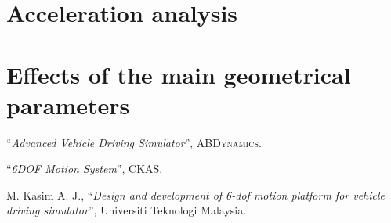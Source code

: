 \documentclass[10.5pt, twocolumn]{article}
\newcommand{\Virgolette}[1]{``#1''}
\begin{document}
\section{Acceleration analysis}

\section{Effects of the main geometrical parameters}


\begin{thebibliography}{}
\Virgolette{\textit{Advanced Vehicle Driving Simulator}}, \textsc{ABDynamics}.

\Virgolette{\textit{6DOF Motion System}}, \textsc{CKAS}.

M. Kasim A. J., \Virgolette{\textit{Design and development of 6-dof motion platform for vehicle driving simulator}}, Universiti Teknologi Malaysia.
\end{thebibliography}
\end{document}

